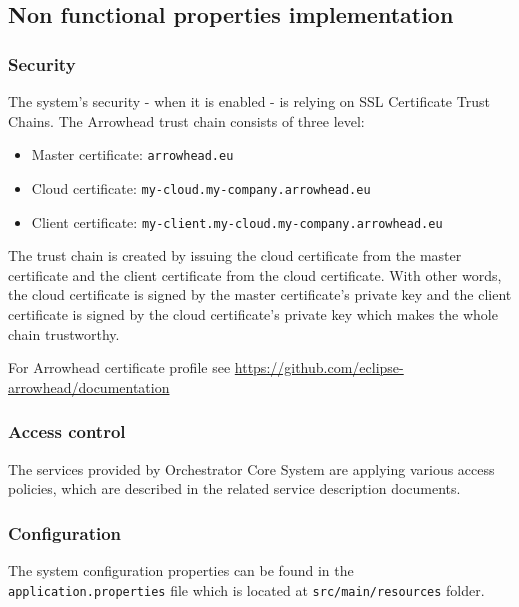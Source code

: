 \documentclass[a4paper]{arrowhead}
\begin{document}
\clearpage

\subsection {Non functional properties implementation}

\subsubsection {Security}

The system's security - when it is enabled - is relying on SSL Certificate Trust Chains. The Arrowhead trust chain consists of three level:

\begin{itemize}
    \item Master certificate: \texttt{arrowhead.eu}
    \item Cloud certificate: \texttt{my-cloud.my-company.arrowhead.eu}
    \item Client certificate: \texttt{my-client.my-cloud.my-company.arrowhead.eu}
\end{itemize}

The trust chain is created by issuing the cloud certificate from the master certificate and the client certificate from the cloud certificate. With other words, the cloud certificate is signed by the master certificate's private key and the client certificate is signed by the cloud certificate's private key which makes the whole chain trustworthy.

For Arrowhead certificate profile see \url{https://github.com/eclipse-arrowhead/documentation}

\subsubsection {Access control}
The services provided by Orchestrator Core System are applying various access policies, which are described in the related service description documents.

\subsubsection {Configuration}
   
The system configuration properties can be found in the \texttt{application.properties} file which is located at \texttt{src/main/resources} folder.
\end{document}
